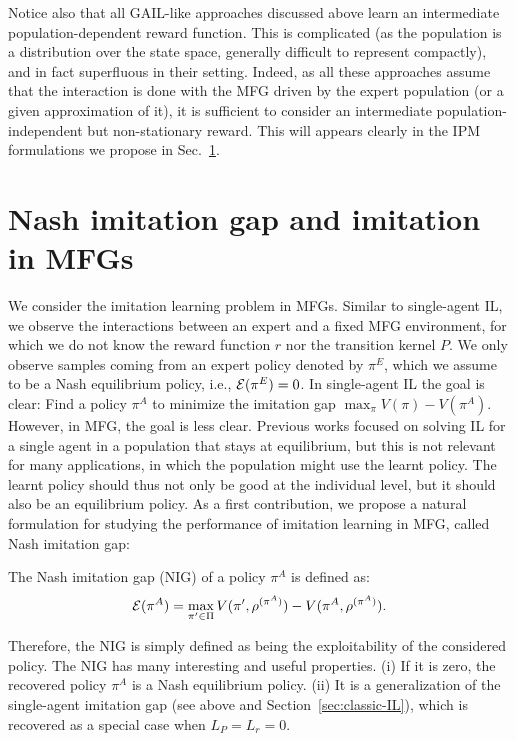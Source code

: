 \documentclass{article}
\begin{document}
Notice also that all GAIL-like approaches discussed above learn an intermediate population-dependent reward function. This is complicated (as the population is a distribution over the state space, generally difficult to represent compactly), and in fact superfluous in their setting. Indeed, as all these approaches assume that the interaction is done with the MFG driven by the expert population (or a given approximation of it), it is sufficient to consider an intermediate population-independent but non-stationary reward. This will appears clearly in the IPM formulations we propose in Sec.~\ref{sec:imitation-mfg}.

\section{Nash imitation gap and imitation in MFGs}\label{sec:imitation-mfg}

We consider the imitation learning problem in MFGs. 
Similar to single-agent IL, we observe the interactions between an expert and a fixed MFG environment, for which we do not know the reward function $r$ nor the transition kernel $P$. 
We only observe samples coming from an expert policy denoted by $\pi^E$, which we assume to be a Nash equilibrium policy, i.e., $\mathcal{E}(\pi^E) = 0$. 
In single-agent IL the goal is clear: Find a policy $\pi^A$ to minimize the imitation gap $\max_{\pi} V(\pi) - V(\pi^A)$.  
However, in MFG, the goal is less clear. Previous works focused on solving IL for a single agent in a population that stays at equilibrium, but this is not relevant for many applications, in which the population might use the learnt policy. The learnt policy should thus not only be good at the individual level, but it should also be an equilibrium policy. 
As a first contribution, we propose a natural formulation for studying the performance of imitation learning in MFG, called Nash imitation gap:
\begin{definition}
The Nash imitation gap (NIG) of a policy $\pi^A$ is defined as: 
\begin{equation}
    \mathcal{E}(\pi^A) = \max_{\pi' \in \Pi} V(\pi', \rho^{(\pi^A)}) - V(\pi^A, \rho^{(\pi^A)}).
\end{equation}
\end{definition}
Therefore, the NIG is simply defined as being the exploitability of the considered policy.
The NIG has many interesting and useful properties. (i) If it is zero, the recovered policy $\pi^A$ is a Nash equilibrium policy. (ii) It is a generalization of the single-agent imitation gap (see above and Section~\ref{sec:classic-IL}),
which is recovered as a special case when $L_P=L_r=0$.
\end{document}
